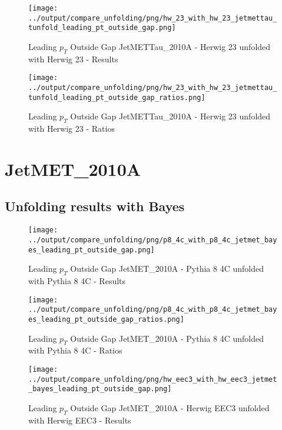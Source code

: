 \documentclass[11pt]{book}
\begin{document}
\begin{figure}[ht]
\centering
\texttt{[image: ../output/compare\_unfolding/png/hw\_23\_with\_hw\_23\_jetmettau\_tunfold\_leading\_pt\_outside\_gap.png]}
\caption{Leading $p_{T}$ Outside Gap JetMETTau\_2010A - Herwig 23 unfolded with Herwig 23 - Results}
\label{hw_23_hw_23_jetmettau_tunfold_leading_pt_outside_gap_a}
\end{figure}

\begin{figure}[ht]
\centering
\texttt{[image: ../output/compare\_unfolding/png/hw\_23\_with\_hw\_23\_jetmettau\_tunfold\_leading\_pt\_outside\_gap\_ratios.png]}
\caption{Leading $p_{T}$ Outside Gap JetMETTau\_2010A - Herwig 23 unfolded with Herwig 23 - Ratios}
\label{hw_23_hw_23_jetmettau_tunfold_leading_pt_outside_gap_b}
\end{figure}

\clearpage
\section{JetMET\_2010A}
\subsection{Unfolding results with Bayes}

\begin{figure}[ht]
\centering
\texttt{[image: ../output/compare\_unfolding/png/p8\_4c\_with\_p8\_4c\_jetmet\_bayes\_leading\_pt\_outside\_gap.png]}
\caption{Leading $p_{T}$ Outside Gap JetMET\_2010A - Pythia 8 4C unfolded with Pythia 8 4C - Results}
\label{p8_p8_jetmet_bayes_leading_pt_outside_gap_a}
\end{figure}

\begin{figure}[ht]
\centering
\texttt{[image: ../output/compare\_unfolding/png/p8\_4c\_with\_p8\_4c\_jetmet\_bayes\_leading\_pt\_outside\_gap\_ratios.png]}
\caption{Leading $p_{T}$ Outside Gap JetMET\_2010A - Pythia 8 4C unfolded with Pythia 8 4C - Ratios}
\label{p8_p8_jetmet_bayes_leading_pt_outside_gap_b}
\end{figure}

\begin{figure}[ht]
\centering
\texttt{[image: ../output/compare\_unfolding/png/hw\_eec3\_with\_hw\_eec3\_jetmet\_bayes\_leading\_pt\_outside\_gap.png]}
\caption{Leading $p_{T}$ Outside Gap JetMET\_2010A - Herwig EEC3 unfolded with Herwig EEC3 - Results}
\label{hw_eec3_hw_eec3_jetmet_bayes_leading_pt_outside_gap_a}
\end{figure}
\end{document}
